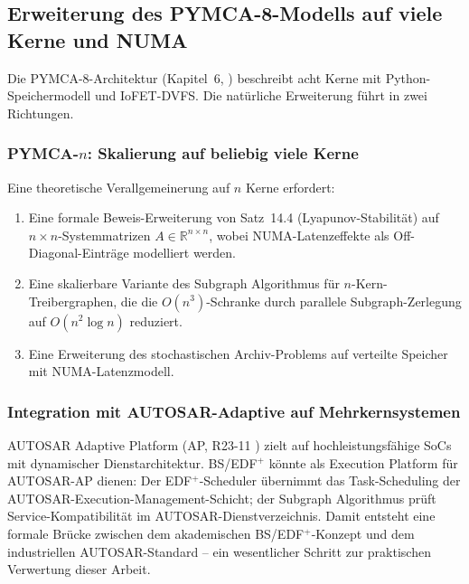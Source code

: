 ﻿\documentclass[a4paper,12pt]{scrreprt}
\theoremstyle{definition}
\begin{document}
	\subsection{Erweiterung des PYMCA-8-Modells auf viele Kerne und NUMA}
	
	Die PYMCA-8-Architektur (Kapitel~6, \cite{Epp2026pymca8}) beschreibt
	acht Kerne mit Python-Speicher\-modell und IoFET-DVFS. Die natürliche
	Erweiterung führt in zwei Richtungen.
	
	\subsubsection{PYMCA-$n$: Skalierung auf beliebig viele Kerne}
	
	Eine theoretische Verallgemeinerung auf $n$ Kerne erfordert:
	
	\begin{enumerate}
		\item Eine formale Beweis-Erweiterung von Satz~14.4 (Lyapunov-Stabilität)
		auf $n \times n$-Systemmatrizen $A \in \mathbb{R}^{n \times n}$, wobei
		NUMA-Latenzeffekte als Off-Diagonal-Einträge modelliert werden.
		\item Eine skalierbare Variante des Subgraph Algorithmus
		\cite{Epp2026subgraph} für $n$-Kern-Treibergraphen, die die
		$O(n^3)$-Schranke durch parallele Subgraph-Zerlegung auf
		$O(n^2 \log n)$ reduziert.
		\item Eine Erweiterung des stochastischen Archiv-Problems
		\cite{Epp2026archv} auf verteilte Speicher mit NUMA-Latenzmodell.
	\end{enumerate}
	
	\subsubsection{Integration mit AUTOSAR-Adaptive auf Mehrkernsystemen}
	
	AUTOSAR Adaptive Platform (AP, R23-11 \cite{AUTOSAR2023}) zielt auf
	hochleistungsfähige SoCs mit dynamischer Dienstarchitektur.
	BS/EDF$^+$ könnte als Execution Platform für AUTOSAR-AP dienen:
	Der EDF$^+$-Scheduler übernimmt das Task-Scheduling der
	AUTOSAR-Execution-Management-Schicht; der Subgraph Algorithmus
	prüft Service-Kompatibilität im AUTO\-SAR-Dienstverzeichnis.
	Damit entsteht eine formale Brücke zwischen dem akademischen
	BS/EDF$^+$-Konzept und dem industriellen AUTOSAR-Standard --
	ein wesentlicher Schritt zur praktischen Verwertung dieser Arbeit.
	
\end{document}
